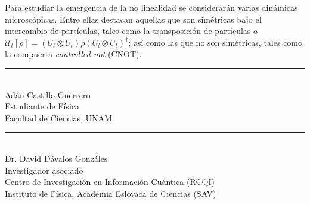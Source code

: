 \documentclass[10pt]{article}
\newcommand{\mcU}{\mathcal{U}}
\begin{document}
Para estudiar la emergencia de la no linealidad se considerarán varias dinámicas microscópicas. Entre ellas destacan aquellas que son simétricas bajo el intercambio de partículas, tales como la transposición de partículas o $\mcU_t[\rho]=(U_t \otimes U_t) \rho (U_t \otimes U_t)^\dagger{}$; así como las que no son simétricas, tales como la compuerta \textit{controlled not} (CNOT).

\vspace{1.5cm}


\begin{center}
    \rule{200pt}{0.4pt}\\
    Adán Castillo Guerrero \\
    Estudiante de Física \\
    Facultad de Ciencias, UNAM \\
    
\end{center}

\vspace{1.0cm}

\begin{center}
    \rule{200pt}{0.4pt}\\
    Dr. David Dávalos Gonzáles \\
    Investigador asociado\\
    Centro de Investigación en Información Cuántica (RCQI)\\
    Instituto de Física, Academia Eslovaca de Ciencias (SAV)
\end{center}


\end{document}
